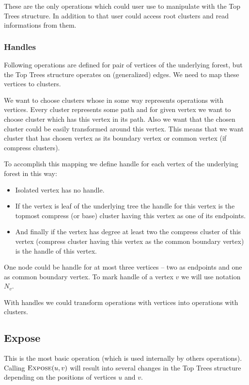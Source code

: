 These are the only operations which could user use to manipulate with the Top
Trees structure. In addition to that user could access root clusters and read
informations from them.

\subsubsection{Handles}

Following operations are defined for pair of vertices of the underlying forest,
but the Top Trees structure operates on (generalized) edges. We need to map
these vertices to clusters.

We want to choose clusters whose in some way represents operations with
vertices. Every cluster represents some path and for given vertex we want to
choose cluster which has this vertex in its path. Also we want that the chosen
cluster could be easily transformed around this vertex. This means that we want
cluster that has chosen vertex as its boundary vertex or common vertex
(if compress clusters).

To accomplish this mapping we define {\I handle} for each vertex of the
underlying forest in this way:

\begin{itemize}
\item Isolated vertex has no handle.
\item If the vertex is leaf of the underlying tree the
handle for this vertex is the topmost compress (or base) cluster having this
vertex as one of its endpoints.
\item And finally if the vertex has degree at least two the compress cluster of
this vertex (compress cluster having this vertex as the common boundary vertex)
is the handle of this vertex.
\end{itemize}

One node could be handle for at most three vertices -- two as endpoints and one
as common boundary vertex. To mark handle of a vertex $v$ we will use notation
$N_v$.

With handles we could transform operations with vertices into operations with
clusters.

\subsection{Expose}

This is the most basic operation (which is used internally by others
operations). Calling $\hbox{\sc Expose}(u,v)$ will result into several changes in the Top
Trees structure depending on the positions of vertices $u$ and $v$.

